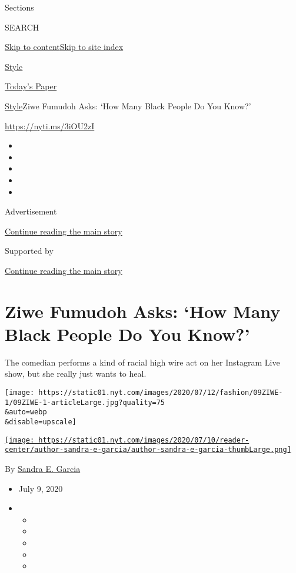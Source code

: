 Sections

SEARCH

\protect\hyperlink{site-content}{Skip to
content}\protect\hyperlink{site-index}{Skip to site index}

\href{https://www.nytimes.com/section/style}{Style}

\href{https://myaccount.nytimes.com/auth/login?response_type=cookie\&client_id=vi}{}

\href{https://www.nytimes.com/section/todayspaper}{Today's Paper}

\href{/section/style}{Style}\textbar{}Ziwe Fumudoh Asks: `How Many Black
People Do You Know?'

\url{https://nyti.ms/3iOU2zI}

\begin{itemize}
\item
\item
\item
\item
\item
\end{itemize}

Advertisement

\protect\hyperlink{after-top}{Continue reading the main story}

Supported by

\protect\hyperlink{after-sponsor}{Continue reading the main story}

\hypertarget{ziwe-fumudoh-asks-how-many-black-people-do-you-know}{%
\section{Ziwe Fumudoh Asks: `How Many Black People Do You
Know?'}\label{ziwe-fumudoh-asks-how-many-black-people-do-you-know}}

The comedian performs a kind of racial high wire act on her Instagram
Live show, but she really just wants to heal.

\texttt{[image: https://static01.nyt.com/images/2020/07/12/fashion/09ZIWE-1/09ZIWE-1-articleLarge.jpg?quality=75\\\&auto=webp\\\&disable=upscale]}

\href{https://www.nytimes.com/by/sandra-e-garcia}{\texttt{[image: https://static01.nyt.com/images/2020/07/10/reader-center/author-sandra-e-garcia/author-sandra-e-garcia-thumbLarge.png]}}

By \href{https://www.nytimes.com/by/sandra-e-garcia}{Sandra E. Garcia}

\begin{itemize}
\item
  July 9, 2020
\item
  \begin{itemize}
  \item
  \item
  \item
  \item
  \item
  \end{itemize}
\end{itemize}

